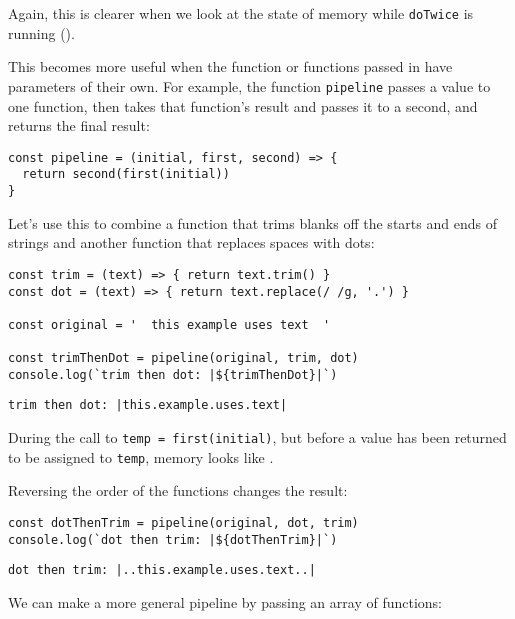 Again,
this is clearer when we look at the state of memory while \texttt{doTwice} is running
().


This becomes more useful when the function or functions passed in have parameters of their own.
For example,
the function \texttt{pipeline} passes a value to one function,
then takes that function's result and passes it to a second,
and returns the final result:

\begin{verbatim}
const pipeline = (initial, first, second) => {
  return second(first(initial))
}
\end{verbatim}

Let's use this to combine
a function that trims blanks off the starts and ends of strings
and another function that replaces spaces with dots:

\begin{verbatim}
const trim = (text) => { return text.trim() }
const dot = (text) => { return text.replace(/ /g, '.') }

const original = '  this example uses text  '

const trimThenDot = pipeline(original, trim, dot)
console.log(`trim then dot: |${trimThenDot}|`)
\end{verbatim}

\begin{verbatim}
trim then dot: |this.example.uses.text|
\end{verbatim}

During the call to \texttt{temp\ =\ first(initial)},
but before a value has been returned to be assigned to \texttt{temp},
memory looks like .


Reversing the order of the functions changes the result:

\begin{verbatim}
const dotThenTrim = pipeline(original, dot, trim)
console.log(`dot then trim: |${dotThenTrim}|`)
\end{verbatim}

\begin{verbatim}
dot then trim: |..this.example.uses.text..|
\end{verbatim}

We can make a more general pipeline by passing an array of functions:


